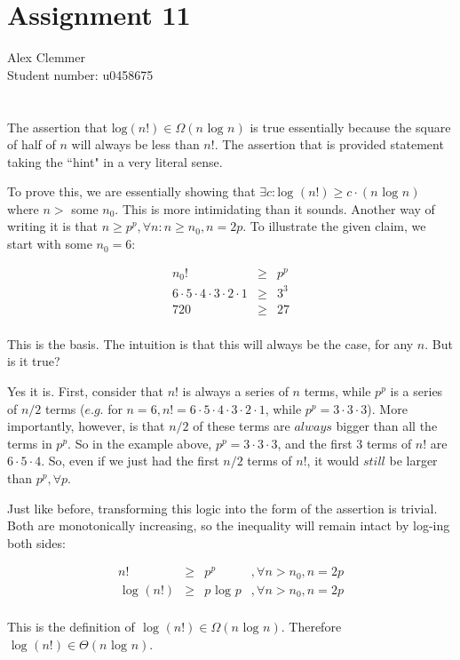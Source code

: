 \documentclass[a4paper]{article}
\begin{document}
\section*{Assignment 11}
Alex Clemmer\\
Student number: u0458675

\section*{}

The assertion that $\mbox{log}(n!) \in \Omega(n \mbox{ log } n)$ is true essentially because the square of half of $n$ will always be less than $n!$. The assertion that is provided statement taking the ``hint" in a very literal sense.

To prove this, we are essentially showing that $\exists c : \mbox{log }(n!) \ge c \cdot (n \mbox{ log } n)$ where $n >$ some $n_0$. This is more intimidating than it sounds. Another way of writing it is that $n \ge p^p, \forall n : n \ge n_0, n = 2p$. To illustrate the given claim, we start with some $n_0 = 6$:

\begin{equation*}
\begin{array}{rcl}
n_0! & \ge & p^p \\
6 \cdot 5 \cdot 4 \cdot 3 \cdot 2 \cdot 1 & \ge & 3^3 \\
720 & \ge & 27 \\
\end{array}
\end{equation*}

This is the basis. The intuition is that this will always be the case, for any $n$. But is it true?

Yes it is. First, consider that $n!$ is always a series of $n$ terms, while $p^p$ is a series of $n/2$ terms ($\textit{e.g.}$ for $n = 6, n! = 6 \cdot 5 \cdot 4 \cdot 3 \cdot 2 \cdot 1$, while $p^p = 3 \cdot 3 \cdot 3$). More importantly, however, is that $n/2$ of these terms are $\textit{always}$ bigger than all the terms in $p^p$.  So in the example above, $p^p = 3 \cdot 3 \cdot 3$, and the first 3 terms of $n!$ are $6 \cdot 5 \cdot 4$. So, even if we just had the first $n/2$ terms of $n!$, it would $\textit{still}$ be larger than $p^p, \forall p$.

Just like before, transforming this logic into the form of the assertion is trivial. Both are monotonically increasing, so the inequality will remain intact by log-ing both sides:

\begin{equation*}
\begin{array}{rcll}
n! & \ge & p^p & , \forall n > n_0, n = 2p \\
\mbox{ log }(n!) & \ge & p \mbox{ log } p & , \forall n > n_0, n = 2p \\
\end{array}
\end{equation*}

This is the definition of $\mbox{ log }(n!) \in \Omega(n \mbox{ log } n)$. Therefore $\mbox{ log }(n!) \in \Theta(n \mbox{ log } n)$.
\end{document}
